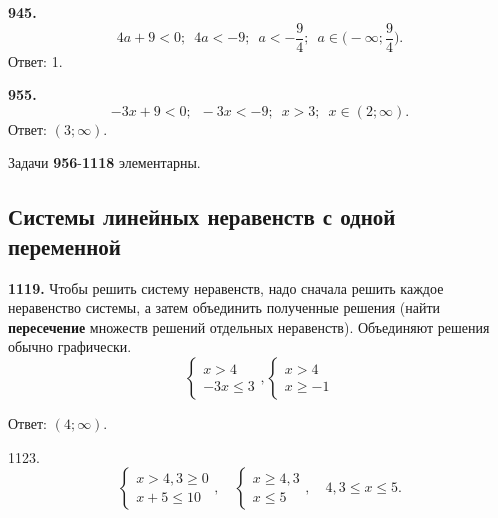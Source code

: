 \textbf{945.} $$4a+9<0;\enspace 4a<-9;\enspace a<-\frac{9}{4};\enspace a\in\bigg(-\infty;\frac{9}{4}\bigg).$$  \newline \null \hspace*{\fill} Ответ:  1.

\textbf{955.} $$-3x+9<0;\enspace -3x<-9;\enspace x>3;\enspace x\in (2;\infty).$$ \newline \null \hspace*{\fill} Ответ: $(3;\infty)$.

Задачи  \textbf{956}-\textbf{1118} элементарны.


\subsection{Системы линейных неравенств с одной переменной}


\textbf{1119.} Чтобы решить систему неравенств, надо сначала решить каждое  неравенство системы, а затем объединить полученные решения (найти \textbf{пересечение} множеств решений отдельных неравенств).  Объединяют решения обычно графически. $$\begin{cases}x>4\\-3x\leq3 \end{cases}, \begin{cases}x>4\\x\geq-1 \end{cases}$$
\begin{figure}[h]
\end{figure}
\newline \null \hspace*{\fill} Ответ: $(4;\infty)$. 

1123. $$\begin{cases}x>4,3\geq0\\x+5\leq 10 \end{cases},\quad\begin{cases}x\geq4,3\\x\leq5 \end{cases},\quad 4,3\leq x\leq5.$$    

\begin{figure}[h!]
\end{figure}

